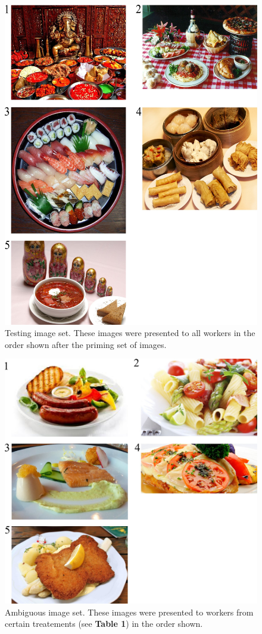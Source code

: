 \documentclass[a4paper]{report}
\begin{document}
\begin{figure}
	\includegraphics[scale=1.00]{figs/taskImages/testImages.jpg}
	\caption{Testing image set. These images were presented to all workers in 
		the order shown after the priming set of images.}
\end{figure}

\begin{figure}
	\includegraphics[scale=1.00]{figs/taskImages/ambiguous.jpg}
	\caption{ Ambiguous image set. These images were presented to workers from 
		certain treatements (see \textbf{Table 1}) in the order shown.}
\end{figure}
\end{document}

